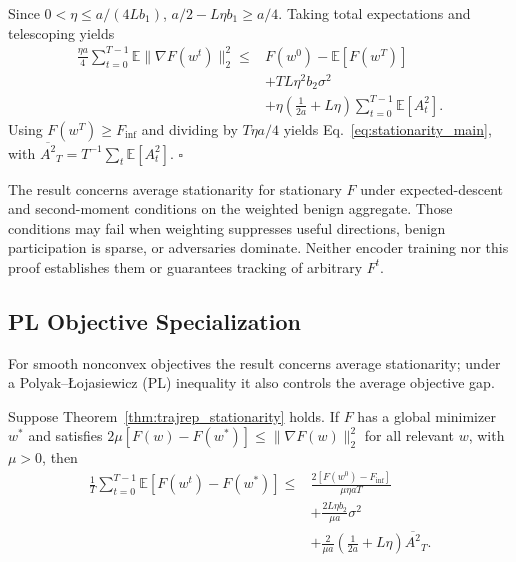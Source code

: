 Since $0<\eta\leq a/(4Lb_1)$, $a/2-L\eta b_1\geq a/4$. Taking total expectations and telescoping yields
\begin{equation}
\begin{aligned}
\frac{\eta a}{4}\sum_{t=0}^{T-1}\mathbb E\|\nabla F(w^t)\|_2^2\leq{}&F(w^0)-\mathbb E[F(w^T)]\\
&+TL\eta^2b_2\sigma^2\\
&+\eta\left(\frac{1}{2a}+L\eta\right)\sum_{t=0}^{T-1}\mathbb E[A_t^2].
\end{aligned}
\label{eq:app_telescoped_bound}
\end{equation}
Using $F(w^T)\geq F_{\inf}$ and dividing by $T\eta a/4$ yields Eq.~\eqref{eq:stationarity_main}, with $\overline{A^2}_T=T^{-1}\sum_t\mathbb E[A_t^2]$. \hfill$\square$

\noindent The result concerns average stationarity for stationary $F$ under expected-descent and second-moment conditions on the weighted benign aggregate. Those conditions may fail when weighting suppresses useful directions, benign participation is sparse, or adversaries dominate. Neither encoder training nor this proof establishes them or guarantees tracking of arbitrary $F^t$.

\subsection{PL Objective Specialization}
\label{app:pl_specialization}

For smooth nonconvex objectives the result concerns average stationarity; under a Polyak--{\L}ojasiewicz (PL) inequality it also controls the average objective gap.

\begin{corollary}
\label{cor:app_pl_bound}
Suppose Theorem~\ref{thm:trajrep_stationarity} holds. If $F$ has a global minimizer $w^\ast$ and satisfies $2\mu[F(w)-F(w^\ast)]\leq\|\nabla F(w)\|_2^2$ for all relevant $w$, with $\mu>0$, then
\begin{equation}
\begin{aligned}
\frac1T\sum_{t=0}^{T-1}\mathbb E[F(w^t)-F(w^\ast)]\leq{}&\frac{2[F(w^0)-F_{\inf}]}{\mu\eta aT}\\
&+\frac{2L\eta b_2}{\mu a}\sigma^2\\
&+\frac{2}{\mu a}\left(\frac1{2a}+L\eta\right)\overline{A^2}_T.
\end{aligned}
\label{eq:app_pl_bound}
\end{equation}
\end{corollary}

